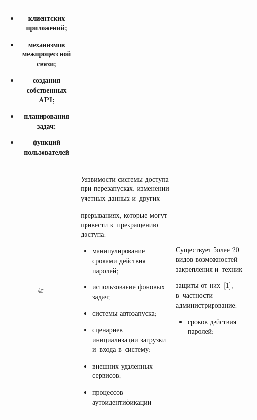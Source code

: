 \begin{table}
\begin{center}
\begin{tabular}{|c|p{58mm}|p{58mm}|}
\begin{itemize}
\item клиентских приложений;

\item механизмов межпроцессной связи;

\item создания собственных API;

\item планирования задач; 

\item функций пользователей\vspace*{-6pt}

\end{itemize}\\

\hline

4г&Уязвимости системы доступа при перезапусках, изменении учетных данных и~других 

прерываниях, которые могут привести к~прекращению доступа:\vspace*{-6pt}

\begin{itemize}

\addtolength{\itemsep}{-6pt}

\item манипулирование сроками действия паролей;

\item использование фоновых задач;

\item системы автозапуска;

\item сценариев инициализации загрузки и~входа в~систему;

\item внешних удаленных сервисов;

\item процессов аутоидентификации\vspace*{-6pt} 

\end{itemize}&Существует более 20 видов возможностей закрепления и~техник 

защиты от них~[1], в~частности администрирование:\vspace*{-6pt}

\begin{itemize}

\addtolength{\itemsep}{-6pt}

\item сроков действия паролей;


\end{itemize}
\end{tabular}
\end{center}
\end{table}
